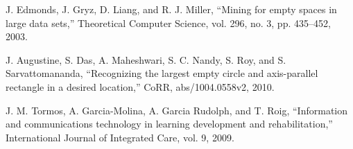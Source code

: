 \begin{thebibliography}{31}
 J. Edmonds, J. Gryz, D. Liang, and R. J. Miller, “Mining for
empty spaces in large data sets,” Theoretical Computer Science,
vol. 296, no. 3, pp. 435–452, 2003.

J. Augustine, S. Das, A. Maheshwari, S. C. Nandy, S. Roy,
and S. Sarvattomananda, “Recognizing the largest empty circle and axis-parallel rectangle in a desired location,” CoRR,
abs/1004.0558v2, 2010.


J. M. Tormos, A. Garcia-Molina, A. Garcia Rudolph, and T.
Roig, “Information and communications technology in learning development and rehabilitation,” International Journal of
Integrated Care, vol. 9, 2009.
\end{thebibliography}
